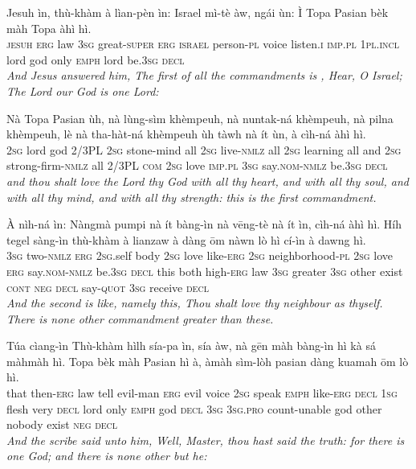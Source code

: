 \documentclass[11pt,a4paper]{article}
\begin{document}
\begin{exe}
\gll Jesuh ìn, thù-khàm à lìan-pèn ìn: Israel mì-tè àw, ngái ùn: Ì Topa Pasian bèk màh Topa àhì hì. \\
     \textsc{jesuh} \textsc{erg} law \textsc{3sg} great-\textsc{super} \textsc{erg} \textsc{israel} person-\textsc{pl} voice listen.\textsc{i} \textsc{imp}.\textsc{pl} \textsc{1pl}.\textsc{incl} lord god only \textsc{emph} lord be.\textsc{3sg} \textsc{decl} \\
\glt \textcolor{kjvcolor}{\textit{And Jesus answered him, The first of all the commandments is , Hear, O Israel; The Lord our God is one Lord:}}

\gll Nà Topa Pasian ùh, nà lùng-sìm khèmpeuh, nà nuntak-ná khèmpeuh, nà pilna khèmpeuh, lè nà tha-hàt-ná khèmpeuh ùh tàwh nà ít ùn, à cìh-ná àhì hì. \\
     \textsc{2sg} lord god 2/3PL \textsc{2sg} stone-mind all \textsc{2sg} live-\textsc{nmlz} all \textsc{2sg} learning all and \textsc{2sg} strong-firm-\textsc{nmlz} all 2/3PL \textsc{com} \textsc{2sg} love \textsc{imp}.\textsc{pl} \textsc{3sg} say.\textsc{nom}-\textsc{nmlz} be.\textsc{3sg} \textsc{decl} \\
\glt \textcolor{kjvcolor}{\textit{and thou shalt love the Lord thy God with all thy heart, and with all thy soul, and with all thy mind, and with all thy strength: this is the first commandment.}}

\gll À nìh-ná ìn: Nàngmà pumpi nà ít bàng-ìn nà vēng-tè nà ít ìn, cìh-ná àhì hì. Híh tegel sàng-ìn thù-khàm à lianzaw à dàng ōm nàwn lò hì cí-ìn à dawng hì. \\
     \textsc{3sg} two-\textsc{nmlz} \textsc{erg} \textsc{2sg}.self body \textsc{2sg} love like-\textsc{erg} \textsc{2sg} neighborhood-\textsc{pl} \textsc{2sg} love \textsc{erg} say.\textsc{nom}-\textsc{nmlz} be.\textsc{3sg} \textsc{decl} this both high-\textsc{erg} law \textsc{3sg} greater \textsc{3sg} other exist \textsc{cont} \textsc{neg} \textsc{decl} say-\textsc{quot} \textsc{3sg} receive \textsc{decl} \\
\glt \textcolor{kjvcolor}{\textit{And the second is like, namely this, Thou shalt love thy neighbour as thyself. There is none other commandment greater than these.}}

\gll Túa cìang-ìn Thù-khàm hìlh sía-pa ìn, sía àw, nà gēn màh bàng-ìn hì kà sá màhmàh hì. Topa bèk màh Pasian hì à, àmàh sìm-lòh pasian dàng kuamah ōm lò hì. \\
     that then-\textsc{erg} law tell evil-man \textsc{erg} evil voice \textsc{2sg} speak \textsc{emph} like-\textsc{erg} \textsc{decl} \textsc{1sg} flesh very \textsc{decl} lord only \textsc{emph} god \textsc{decl} \textsc{3sg} \textsc{3sg}.\textsc{pro} count-unable god other nobody exist \textsc{neg} \textsc{decl} \\
\glt \textcolor{kjvcolor}{\textit{And the scribe said unto him, Well, Master, thou hast said the truth: for there is one God; and there is none other but he:}}


\end{exe}
\end{document}
